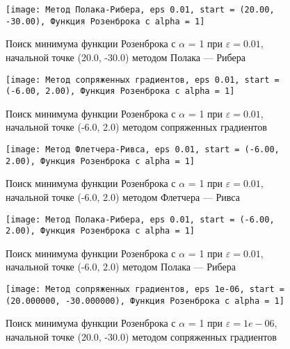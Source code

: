             \begin{figure}[H]
	        \centering
	        \texttt{[image: Метод Полака-Рибера, eps 0.01, start = (20.00, -30.00), Функция Розенброка с alpha = 1]}%
	        \caption{Поиск минимума функции Розенброка с $\alpha$ = 1 при $\varepsilon = 0.01$, начальной точке (20.0, -30.0) методом Полака --- Рибера}
	        \vspace*{-1.2cm}
            \end{figure}
            
            \begin{figure}[H]
	        \centering
	        \texttt{[image: Метод сопряженных градиентов, eps 0.01, start = (-6.00, 2.00), Функция Розенброка с alpha = 1]}%
	        \caption{Поиск минимума функции Розенброка с $\alpha$ = 1 при $\varepsilon = 0.01$, начальной точке (-6.0, 2.0) методом сопряженных градиентов}
	        \vspace*{-1.2cm}
            \end{figure}
            
            \begin{figure}[H]
	        \centering
	        \texttt{[image: Метод Флетчера-Ривса, eps 0.01, start = (-6.00, 2.00), Функция Розенброка с alpha = 1]}%
	        \caption{Поиск минимума функции Розенброка с $\alpha$ = 1 при $\varepsilon = 0.01$, начальной точке (-6.0, 2.0) методом Флетчера --- Ривса}
	        \vspace*{-1.2cm}
            \end{figure}
            
            \begin{figure}[H]
	        \centering
	        \texttt{[image: Метод Полака-Рибера, eps 0.01, start = (-6.00, 2.00), Функция Розенброка с alpha = 1]}%
	        \caption{Поиск минимума функции Розенброка с $\alpha$ = 1 при $\varepsilon = 0.01$, начальной точке (-6.0, 2.0) методом Полака --- Рибера}
	        \vspace*{-1.2cm}
            \end{figure}
            
            \begin{figure}[H]
	        \centering
	        \texttt{[image: Метод сопряженных градиентов, eps 1e-06, start = (20.000000, -30.000000), Функция Розенброка с alpha = 1]}%
	        \caption{Поиск минимума функции Розенброка с $\alpha$ = 1 при $\varepsilon = 1e-06$, начальной точке (20.0, -30.0) методом сопряженных градиентов}
	        \vspace*{-1.2cm}
            \end{figure}
            
